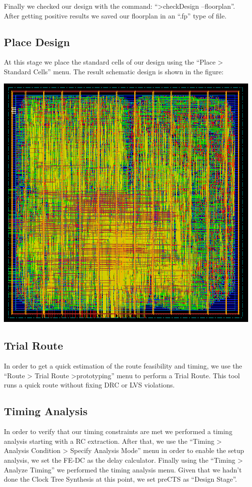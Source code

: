 \documentclass[12pt]{article}
\begin{document}
Finally we checked our design with the command: “>checkDesign –floorplan”. After getting positive results we saved our floorplan in an “.fp” type of file.\\

\subsection{Place Design}
At this stage we place the standard cells of our design using the “Place > Standard Cells” menu. The result schematic design is shown in the figure:
\begin{center}
\includegraphics[scale=0.4]{pic/place.png}
\end{center}

\subsection{Trial Route}
In order to get a quick estimation of the route feasibility and timing, we use the “Route > Trial Route >prototyping” menu to perform a Trial Route. This tool runs a quick route without fixing DRC or LVS violations.

\subsection{Timing Analysis}
In order to verify that our timing constraints are met we performed a timing analysis starting with a RC extraction. After that, we use the “Timing > Analysis Condition > Specify Analysis Mode” menu in order to enable the setup analysis, we set the FE-DC as the delay calculator.  Finally using the “Timing > Analyze Timing” we performed the timing analysis menu. Given that we hadn’t done the Clock Tree Synthesis at this point, we set preCTS as “Design Stage”.\\
\end{document}
